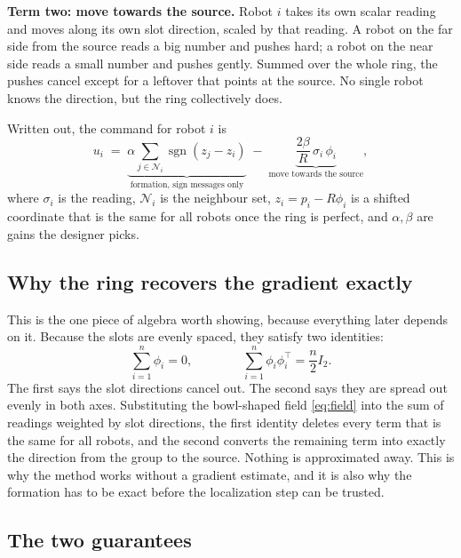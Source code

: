 \documentclass[11pt,a4paper]{article}
\begin{document}
\textbf{Term two: move towards the source.} Robot $i$ takes its own scalar reading and moves along
its own slot direction, scaled by that reading. A robot on the far side from the source reads a big
number and pushes hard; a robot on the near side reads a small number and pushes gently. Summed over
the whole ring, the pushes cancel except for a leftover that points at the source. No single robot
knows the direction, but the ring collectively does.

Written out, the command for robot $i$ is
\begin{equation}\label{eq:controller}
    u_i \;=\;
    \underbrace{\alpha \sum_{j \in \mathcal{N}_i} \operatorname{sgn}(z_j - z_i)}_{\text{formation, sign messages only}}
    \;-\;
    \underbrace{\frac{2\beta}{R}\, \sigma_i \, \phi_i}_{\text{move towards the source}},
\end{equation}
where $\sigma_i$ is the reading, $\mathcal{N}_i$ is the neighbour set, $z_i = p_i - R\phi_i$ is a
shifted coordinate that is the same for all robots once the ring is perfect, and $\alpha, \beta$ are
gains the designer picks.

\subsection{Why the ring recovers the gradient exactly}

This is the one piece of algebra worth showing, because everything later depends on it. Because the
slots are evenly spaced, they satisfy two identities:
\begin{equation}\label{eq:moments}
    \sum_{i=1}^{n} \phi_i = 0,
    \qquad\qquad
    \sum_{i=1}^{n} \phi_i \phi_i^{\top} = \frac{n}{2} I_2 .
\end{equation}
The first says the slot directions cancel out. The second says they are spread out evenly in both
axes. Substituting the bowl-shaped field \eqref{eq:field} into the sum of readings weighted by slot
directions, the first identity deletes every term that is the same for all robots, and the second
converts the remaining term into exactly the direction from the group to the source. Nothing is
approximated away. This is why the method works without a gradient estimate, and it is also why the
formation has to be exact before the localization step can be trusted.

\subsection{The two guarantees}
\end{document}
